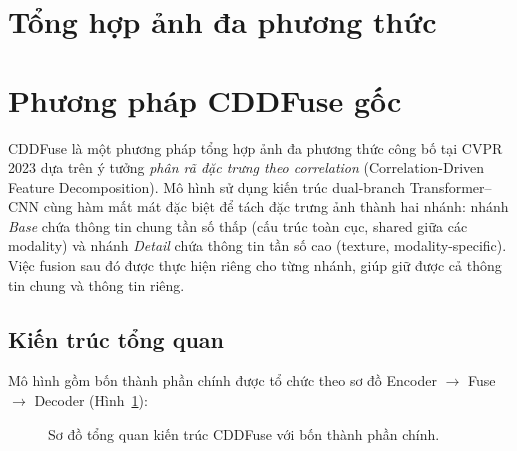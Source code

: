 \section{Tổng hợp ảnh đa phương thức}
\label{sec:mif}


\section{Phương pháp CDDFuse gốc}
\label{sec:cddfuse}

CDDFuse \cite{zhao2023cddfuse} là một phương pháp tổng hợp ảnh đa phương thức công bố tại CVPR 2023 dựa trên ý tưởng \emph{phân rã đặc trưng theo correlation} (Correlation-Driven Feature Decomposition). Mô hình sử dụng kiến trúc dual-branch Transformer--CNN cùng hàm mất mát đặc biệt để tách đặc trưng ảnh thành hai nhánh: nhánh \emph{Base} chứa thông tin chung tần số thấp (cấu trúc toàn cục, shared giữa các modality) và nhánh \emph{Detail} chứa thông tin tần số cao (texture, modality-specific). Việc fusion sau đó được thực hiện riêng cho từng nhánh, giúp giữ được cả thông tin chung và thông tin riêng.

\subsection{Kiến trúc tổng quan}
\label{ssec:cddfuse-arch}

Mô hình gồm bốn thành phần chính được tổ chức theo sơ đồ Encoder $\to$ Fuse $\to$ Decoder (Hình~\ref{fig:cddfuse-arch}):

\begin{figure}[h]
    \centering
    \caption{Sơ đồ tổng quan kiến trúc CDDFuse với bốn thành phần chính.}
    \label{fig:cddfuse-arch}
\end{figure}

